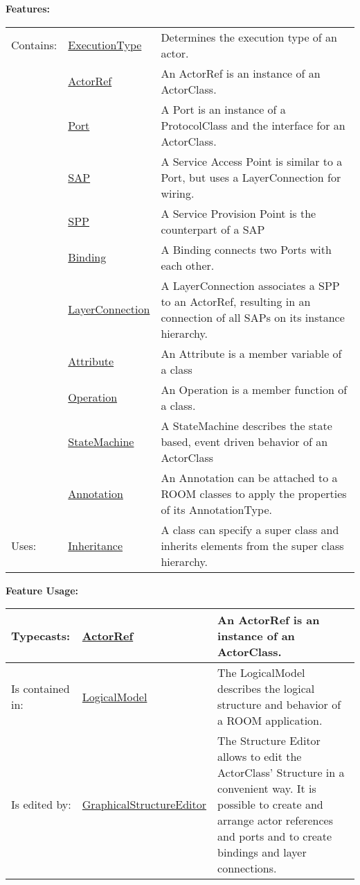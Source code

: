 		
	\begingroup
	\textbf{Features:}
	\renewcommand{\arraystretch}{1.8} %
	\begin{longtable}{l|l p{}}
		\hline
	Contains: & \tabitem \hyperlink{ref:ExecutionType}{ExecutionType}  & Determines the execution type of an actor.\\
	& \tabitem \hyperlink{ref:ActorRef}{ActorRef}  & An ActorRef is an instance of an ActorClass. \\
	& \tabitem \hyperlink{ref:Port}{Port}  & A Port is an instance of a ProtocolClass and the interface for an ActorClass. \\
	& \tabitem \hyperlink{ref:SAP}{SAP}  & A Service Access Point is similar to a Port, but uses a LayerConnection for wiring. \\
	& \tabitem \hyperlink{ref:SPP}{SPP}  & A Service Provision Point is the counterpart of a SAP \\
	& \tabitem \hyperlink{ref:Binding}{Binding}  & A Binding connects two Ports with each other. \\
	& \tabitem \hyperlink{ref:LayerConnection}{LayerConnection}  & A LayerConnection associates a SPP to an ActorRef, resulting in an connection of all SAPs on its instance hierarchy. \\
	& \tabitem \hyperlink{ref:Attribute}{Attribute}  & An Attribute is a member variable of a class \\
	& \tabitem \hyperlink{ref:Operation}{Operation}  & An Operation is a member function of a class. \\
	& \tabitem \hyperlink{ref:StateMachine}{StateMachine}  & A StateMachine describes the state based, event driven behavior of an ActorClass \\
	& \tabitem \hyperlink{ref:Annotation}{Annotation}  & An Annotation can be attached to a ROOM classes to apply the properties of its AnnotationType. \\
	\hline
	Uses: & \tabitem \hyperlink{ref:Inheritance}{Inheritance}  & A class can specify a super class and inherits elements from the super class hierarchy.\\
	\hline
	\end{longtable}
	\endgroup
		
	\begingroup
	\textbf{Feature Usage:}
	\renewcommand{\arraystretch}{1.8} %
	\begin{longtable}{l|l p{}}
		\hline
	Typecasts: & \tabitem \hyperlink{ref:ActorRef}{ActorRef}  & An ActorRef is an instance of an ActorClass.\\
	\hline
	Is contained in: & \tabitem \hyperlink{ref:LogicalModel}{LogicalModel}  & The LogicalModel describes the logical structure and behavior of a ROOM application.\\
	\hline
	Is edited by: & \tabitem \hyperlink{ref:GraphicalStructureEditor}{GraphicalStructureEditor}  & The Structure Editor allows to edit the ActorClass' Structure in a convenient way. It is possible to create and arrange actor references and ports and to create bindings and layer connections.\\
	\hline
	\end{longtable}
	\endgroup
		
